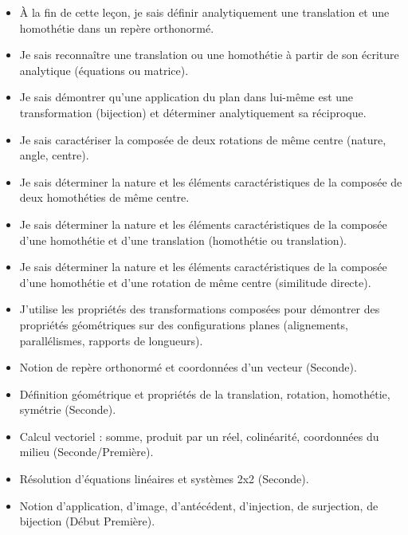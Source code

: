 \documentclass[11pt]{article}
\begin{document}
\begin{objectifs}
\begin{itemize}
\item À la fin de cette leçon, je sais définir analytiquement une translation et une homothétie dans un repère orthonormé.
\item Je sais reconnaître une translation ou une homothétie à partir de son écriture analytique (équations ou matrice).
\item Je sais démontrer qu'une application du plan dans lui-même est une transformation (bijection) et déterminer analytiquement sa réciproque.
\item Je sais caractériser la composée de deux rotations de même centre (nature, angle, centre).
\item Je sais déterminer la nature et les éléments caractéristiques de la composée de deux homothéties de même centre.
\item Je sais déterminer la nature et les éléments caractéristiques de la composée d'une homothétie et d'une translation (homothétie ou translation).
\item Je sais déterminer la nature et les éléments caractéristiques de la composée d'une homothétie et d'une rotation de même centre (similitude directe).
\item J'utilise les propriétés des transformations composées pour démontrer des propriétés géométriques sur des configurations planes (alignements, parallélismes, rapports de longueurs).
\end{itemize}
\end{objectifs}

\begin{prerequis}
\begin{itemize}
\item Notion de repère orthonormé et coordonnées d'un vecteur (Seconde).
\item Définition géométrique et propriétés de la translation, rotation, homothétie, symétrie (Seconde).
\item Calcul vectoriel : somme, produit par un réel, colinéarité, coordonnées du milieu (Seconde/Première).
\item Résolution d'équations linéaires et systèmes 2x2 (Seconde).
\item Notion d'application, d'image, d'antécédent, d'injection, de surjection, de bijection (Début Première).
\end{itemize}
\end{prerequis}
\end{document}

